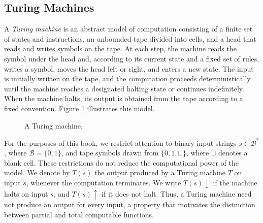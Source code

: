 
\subsection*{Turing Machines}

A \emph{Turing machine} is an abstract model of computation consisting of a finite set of states and instructions, an unbounded tape divided into cells, and a head that reads and writes symbols on the tape. At each step, the machine reads the symbol under the head and, according to its current state and a fixed set of rules, writes a symbol, moves the head left or right, and enters a new state. The input is initially written on the tape, and the computation proceeds deterministically until the machine reaches a designated halting state or continues indefinitely. When the machine halts, its output is obtained from the tape according to a fixed convention. Figure \ref{fig:Turing-Machine} illustrates this model.

\begin{figure}[t]
\centering
{}
\caption{\label{fig:Turing-Machine}A Turing machine.}
\end{figure}

For the purposes of this book, we restrict attention to binary input strings $s\in\mathcal{B}^\ast$, where $\mathcal{B}=\{0,1\}$, and tape symbols drawn from $\{0,1,\sqcup\}$, where $\sqcup$ denotes a blank cell. These restrictions do not reduce the computational power of the model. We denote by $T(s)$ the output produced by a Turing machine $T$ on input $s$, whenever the computation terminates. We write $T(s)\downarrow$ if the machine halts on input $s$, and $T(s)\uparrow$ if it does not halt. Thus, a Turing machine need not produce an output for every input, a property that motivates the distinction between partial and total computable functions.

